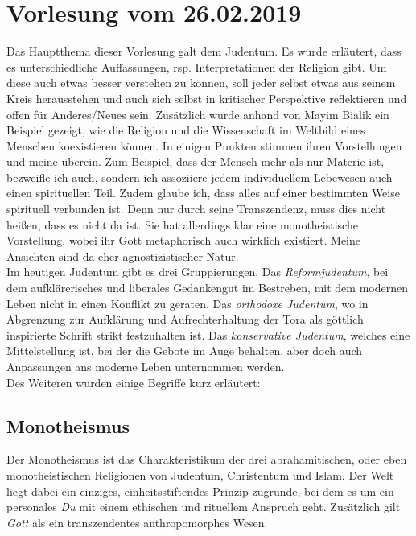 \section{Vorlesung vom 26.02.2019}
Das Hauptthema dieser Vorlesung galt dem Judentum. Es wurde erläutert, dass es unterschiedliche Auffassungen, rsp. Interpretationen der Religion gibt. Um diese auch etwas besser verstehen zu können, soll jeder selbst etwas aus seinem Kreis herausstehen und auch sich selbst in kritischer Perspektive reflektieren und offen für Anderes/Neues sein. Zusätzlich wurde anhand von Mayim Bialik ein Beispiel gezeigt, wie die Religion und die Wissenschaft im Weltbild eines Menschen koexistieren können. In einigen Punkten stimmen ihren Vorstellungen und meine überein. Zum Beispiel, dass der Mensch mehr als nur Materie ist, bezweifle ich auch, sondern ich assoziiere jedem individuellem Lebewesen auch einen spirituellen Teil. Zudem glaube ich, dass alles auf einer bestimmten Weise spirituell verbunden ist. Denn nur durch seine Transzendenz, muss dies nicht heißen, dass es nicht da ist. Sie hat allerdings klar eine monotheistische Vorstellung, wobei ihr Gott metaphorisch auch wirklich existiert. Meine Ansichten sind da eher agnostizistischer Natur.\\

Im heutigen Judentum gibt es drei Gruppierungen. Das \textit{Reformjudentum}, bei dem aufklärerisches und liberales Gedankengut im Bestreben, mit dem modernen Leben nicht in einen Konflikt zu geraten. Das \textit{orthodoxe Judentum}, wo in Abgrenzung zur Aufklärung und Aufrechterhaltung der Tora als göttlich inspirierte Schrift strikt festzuhalten ist. Das \textit{konservative Judentum}, welches eine Mittelstellung ist, bei der die Gebote im Auge behalten, aber doch auch Anpassungen ans moderne Leben unternommen werden.\\

Des Weiteren wurden einige Begriffe kurz erläutert:\\


\subsection*{Monotheismus}
	Der Monotheismus ist das Charakteristikum der drei abrahamitischen, oder eben 			monotheistischen Religionen von Judentum, Christentum und Islam. Der Welt 				liegt dabei ein einziges, einheitsstiftendes Prinzip zugrunde, bei 						dem es um ein personales \textit{Du} mit einem ethischen und rituellem 					Anspruch geht. Zusätzlich gilt \textit{Gott} als ein transzendentes 					anthropomorphes Wesen. \\
